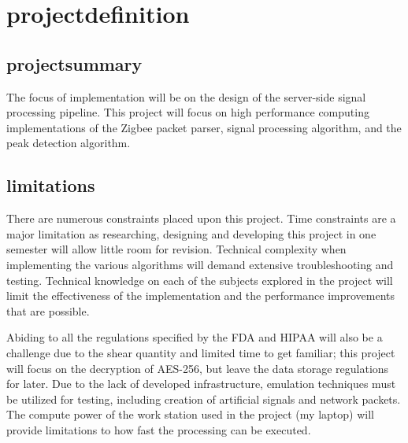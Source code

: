 \documentclass{article}
\begin{document}
\newpage
\section{\gls{projectdefinition}}
\subsection{\gls{projectsummary}}
The focus of implementation will be on the design of the server-side signal processing pipeline. This project will focus on high performance computing implementations of the Zigbee packet parser, signal processing algorithm, and the peak detection algorithm.
\subsection{\gls{limitations}}
There are numerous constraints placed upon this project. Time constraints are a major limitation as researching, designing and developing this project in one semester will allow little room for revision. Technical complexity when implementing the various algorithms will demand extensive troubleshooting and testing. Technical knowledge on each of the subjects explored in the project will limit the effectiveness of the implementation and the performance improvements that are possible. 

Abiding to all the regulations specified by the FDA and HIPAA will also be a challenge due to the shear quantity and limited time to get familiar; this project will focus on the decryption of AES-256, but leave the data storage regulations for later. Due to the lack of developed infrastructure, emulation techniques must be utilized for testing, including creation of artificial signals and network packets. The compute power of the work station used in the project (my laptop) will provide limitations to how fast the processing can be executed. 
\end{document}
